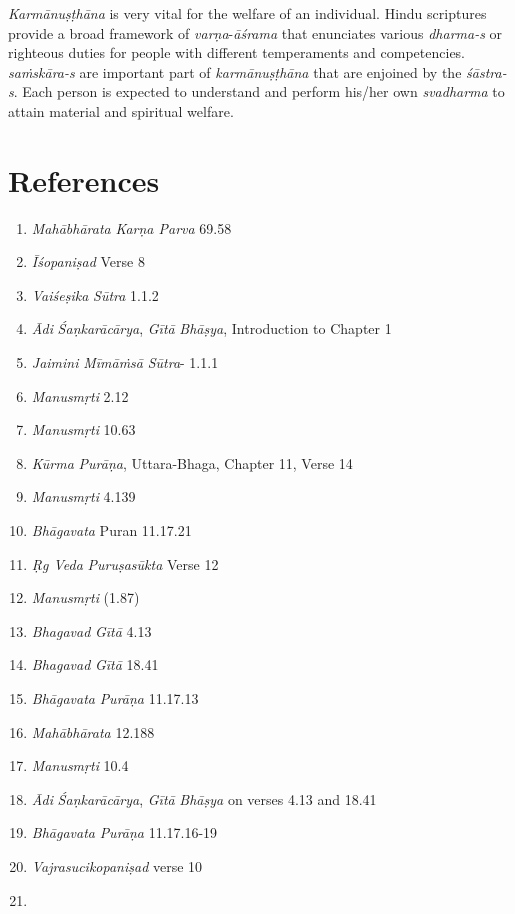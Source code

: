 \emph{Karmānuṣṭhāna} is very vital for the welfare of an individual. Hindu scriptures provide a broad framework of \emph{varṇa}-\emph{āśrama} that enunciates various \emph{dharma-s} or righteous duties for people with different temperaments and competencies. \emph{saṁskāra-s} are important part of \emph{karmānuṣṭhāna} that are enjoined by the \emph{śāstra-s}. Each person is expected to understand and perform his/her own \emph{svadharma} to attain material and spiritual welfare.

\section*{References}

\begin{enumerate}
\itemsep=0pt
\item
  \emph{Mahābhārata} \emph{Karṇa Parva} 69.58
\item
  \emph{Īśopaniṣad} Verse 8
\item
  \emph{Vaiśeṣika} \emph{Sūtra} 1.1.2
\item
  \emph{Ādi} \emph{Śaṇkarācārya}, \emph{Gītā} \emph{Bhāṣya}, Introduction to Chapter 1
\item
  \emph{Jaimini} \emph{Mīmāṁsā} \emph{Sūtra}- 1.1.1
\item
  \emph{Manusmṛti} 2.12
\item
  \emph{Manusmṛti} 10.63
\item
  \emph{Kūrma} \emph{Purāṇa}, Uttara-Bhaga, Chapter 11, Verse 14
\item
  \emph{Manusmṛti} 4.139
\item
  \emph{Bhāgavata} Puran 11.17.21
\item
  \emph{Ṛg Veda} \emph{Puruṣasūkta} Verse 12
\item
  \emph{Manusmṛti} (1.87)
\item
  \emph{Bhagavad} \emph{Gītā} 4.13
\item
  \emph{Bhagavad} \emph{Gītā} 18.41
\item
  \emph{Bhāgavata} \emph{Purāṇa} 11.17.13
\item
  \emph{Mahābhārata} 12.188
\item
  \emph{Manusmṛti} 10.4
\item
  \emph{Ādi} \emph{Śaṇkarācārya}, \emph{Gītā} \emph{Bhāṣya} on verses 4.13 and 18.41
\item
  \emph{Bhāgavata} \emph{Purāṇa} 11.17.16-19
\item
  \emph{Vajrasucikopaniṣad} verse 10
\item

\end{enumerate}
